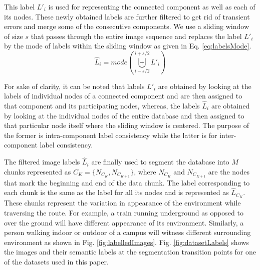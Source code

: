 \documentclass[letterpaper, 10 pt, conference]{ieeeconf}  %
\begin{document}
This label $L'_i$ is used for representing the connected component as well as each of its nodes. These newly obtained labels are further filtered to get rid of transient errors and merge some of the consecutive components. We use a sliding window of size $s$ that passes through the entire image sequence and replaces the label $L'_i$ by the mode of labels within the sliding window as given in Eq. \ref{eq:labelsMode}.
\begin{equation}
 \hat{L}_i = mode(\biguplus\limits_{i-s/2}^{i+s/2} L'_i)
 \label{eq:labelsMode}
\end{equation}

For sake of clarity, it can be noted that labels $L'_i$ are obtained by looking at the labels of individual nodes of a connected component and are then assigned to that component and its participating nodes, whereas, the labels $\hat{L}_i$ are obtained by looking at the individual nodes of the entire database and then assigned to that particular node itself where the sliding window is centered. The purpose of the former is intra-component label consistency while the latter is for inter-component label consistency.

The filtered image labels $\hat{L}_i$ are finally used to segment the database into $M$ chunks represented as $C_K = \{N_{C_K},N_{C_{K+1}}\}$, where $N_{C_K}$ and $N_{C_{K+1}}$ are the nodes that mark the beginning and end of the data chunk. The label corresponding to each chunk is the same as the label for all its nodes and is represented as $\hat{L}_{C_K}$. These chunks represent the variation in appearance of the environment while traversing the route. For example, a train running underground as opposed to over the ground will have different appearance of its environment. Similarly, a person walking indoor or outdoor of a campus will witness different surrounding environment as shown in Fig. \ref{fig:labelledImages}. Fig. \ref{fig:datasetLabels} shows the images and their semantic labels at the segmentation transition points for one of the datasets used in this paper.
\end{document}
